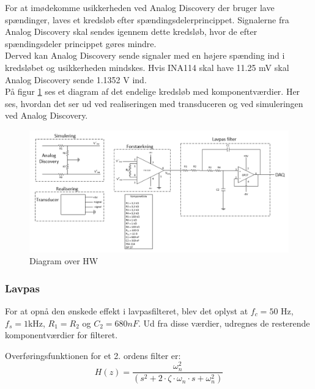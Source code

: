 \newline 
For at imødekomme usikkerheden ved Analog Discovery der bruger lave spændinger, laves et kredsløb efter spændingsdelerprincippet. Signalerne fra Analog Discovery skal sendes igennem dette kredsløb, hvor de efter spændingsdeler princippet gøres mindre.\\  
Derved kan Analog Discovery sende signaler med en højere spænding ind i kredsløbet og usikkerheden mindskes. Hvis INA114 skal have 11.25 mV skal Analog Discovery sende 1.1352 V ind.  
\\
\newline 
På figur \ref{fig:HW} ses et diagram af det endelige kredsløb med komponentværdier. Her ses, hvordan det ser ud ved realiseringen med transduceren og ved simuleringen ved Analog Discovery. 
\begin{figure}[H]
	\centering
	\includegraphics[width=1.0\textwidth]{Figurer/diagram_over_HW}
	\caption{Diagram over HW}
	\label{fig:HW}
\end{figure}

\subsubsection{Lavpas}
For at opnå den ønskede effekt i lavpasfilteret, blev det oplyst at $ f_c=50$ Hz, $ f_s = 1$kHz, $ R_1 = R_2 $ og $ C_2=680 nF$. Ud fra disse værdier, udregnes de resterende komponentværdier for filteret.

Overføringsfunktionen for et 2. ordens filter er: 
\begin{equation}
H(z)=\frac{\omega_n^2}{(s^2 + 2\cdot\zeta \cdot \omega_n \cdot s+\omega_n^2)}
\end{equation}

